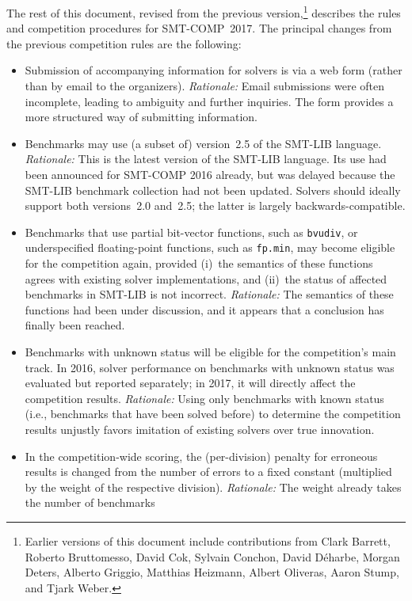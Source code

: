 \documentclass[12pt]{article}
\begin{document}
The rest of this document, revised from the previous
version,\footnote{Earlier versions of this document include
  contributions from Clark Barrett, Roberto Bruttomesso, David Cok,
  Sylvain Conchon, David D{\'e}harbe, Morgan Deters, Alberto Griggio,
  Matthias Heizmann, Albert Oliveras, Aaron Stump, and Tjark Weber.}
describes the rules and competition procedures for SMT-COMP~2017.  The
principal changes from the previous competition rules are the
following:
\begin{itemize}
\item Submission of accompanying information for solvers is via a web
  form (rather than by email to the organizers).  \emph{Rationale:}
  Email submissions were often incomplete, leading to ambiguity and
  further inquiries.  The form provides a more structured way of
  submitting information.
\item Benchmarks may use (a subset of) version~2.5 of the SMT-LIB
  language.  \emph{Rationale:} This is the latest version of the
  SMT-LIB language.  Its use had been announced for SMT-COMP 2016
  already, but was delayed because the SMT-LIB benchmark collection
  had not been updated.  Solvers should ideally support both
  versions~2.0 and~2.5; the latter is largely backwards-compatible.
\item Benchmarks that use partial bit-vector functions, such as
  \texttt{bvudiv}, or underspecified floating-point functions, such as
  \texttt{fp.min}, may become eligible for the competition again,
  provided (i)~the semantics of these functions agrees with existing
  solver implementations, and (ii)~the status of affected benchmarks
  in SMT-LIB is not incorrect.  \emph{Rationale:} The semantics of
  these functions had been under discussion, and it appears that a
  conclusion has finally been reached.
\item Benchmarks with unknown status will be eligible for the
  competition's main track.  In 2016, solver performance on benchmarks
  with unknown status was evaluated but reported separately; in 2017,
  it will directly affect the competition results.  \emph{Rationale:}
  Using only benchmarks with known status (i.e., benchmarks that have
  been solved before) to determine the competition results unjustly
  favors imitation of existing solvers over true innovation.
\item In the competition-wide scoring, the (per-division) penalty for
  erroneous results is changed from the number of errors to a fixed
  constant (multiplied by the weight of the respective division).
  \emph{Rationale:} The weight already takes the number of benchmarks

\end{itemize}
\end{document}
